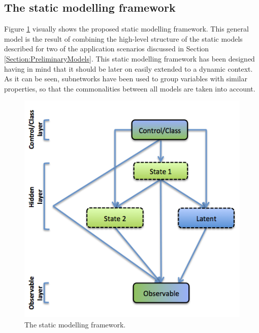 
\subsection{The static modelling framework}\label{StaticFramework}

Figure \ref{Figure:StaticModellingFramework} visually shows the proposed static modelling framework. This general model
is the result of combining the high-level structure of the static models described for two of the application scenarios discussed in Section \ref{Section:PreliminaryModels}. This static modelling framework has been designed having in mind that it should be later on easily extended to a dynamic context. As it can be seen, subnetworks have been used to group variables with similar properties, so that the commonalities between all models are taken into account. 

\begin{figure}[ht!]
\begin{center}
\includegraphics[scale=0.4]{./figures/StaticModellingFramework}
\caption{\label{Figure:StaticModellingFramework} The static modelling framework.}
\end{center}
\end{figure}


